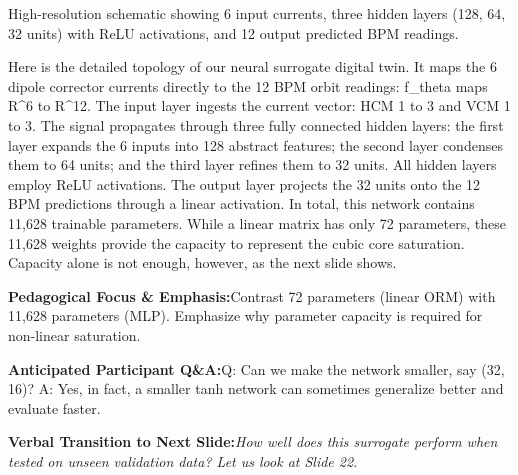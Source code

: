 \documentclass[11pt,a4paper]{article}
\begin{document}
\vspace{0.2em}
\begin{tcolorbox}[colback=lightbg,colframe=bordergray,title={\footnotesize\bfseries\color{darkgray}Slide Visual Blueprint},fontupper=\small,left=6pt,right=6pt,top=2.5pt,bottom=2.5pt,boxrule=0.6pt,arc=2.5pt]
High-resolution schematic showing 6 input currents, three hidden layers (128, 64, 32 units) with ReLU activations, and 12 output predicted BPM readings.
\end{tcolorbox}
\vspace{0.2em}
\begin{tcolorbox}[colback=white,colframe=primaryblue,title={\footnotesize\bfseries\color{white}Spoken Presenter Script},fontupper=\small,left=6pt,right=6pt,top=3pt,bottom=3pt,boxrule=0.8pt,arc=2.5pt]
Here is the detailed topology of our neural surrogate digital twin. It maps the 6 dipole corrector currents directly to the 12 BPM orbit readings: f\_theta maps R\textasciicircum{}6 to R\textasciicircum{}12. The input layer ingests the current vector: HCM 1 to 3 and VCM 1 to 3. The signal propagates through three fully connected hidden layers: the first layer expands the 6 inputs into 128 abstract features; the second layer condenses them to 64 units; and the third layer refines them to 32 units. All hidden layers employ ReLU activations. The output layer projects the 32 units onto the 12 BPM predictions through a linear activation. In total, this network contains 11,628 trainable parameters. While a linear matrix has only 72 parameters, these 11,628 weights provide the capacity to represent the cubic core saturation. Capacity alone is not enough, however, as the next slide shows.
\end{tcolorbox}
\vspace{0.2em}
\begin{tcolorbox}[colback=lightbg,colframe=bordergray,left=6pt,right=6pt,top=3pt,bottom=3pt,boxrule=0.6pt,arc=2.5pt]
\small
\noindent\textbf{\color{navy}Pedagogical Focus \& Emphasis:}\enspace Contrast 72 parameters (linear ORM) with 11,628 parameters (MLP). Emphasize why parameter capacity is required for non-linear saturation.\par\vspace{0.3em}
\noindent\textbf{\color{successgreen}Anticipated Participant Q\&A:}\enspace Q: Can we make the network smaller, say (32, 16)? A: Yes, in fact, a smaller tanh network can sometimes generalize better and evaluate faster.\par\vspace{0.3em}
\noindent\textbf{\color{accent}Verbal Transition to Next Slide:}\enspace \emph{How well does this surrogate perform when tested on unseen validation data? Let us look at Slide 22.}
\end{tcolorbox}
\end{document}

